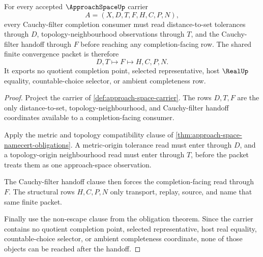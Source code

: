 \begin{theorem}
\label{thm:approach-space-completion-handoff}
For every accepted $\ApproachSpaceUp$ carrier
$$
A=(X,D,T,F,H,C,P,N),
$$
every Cauchy-filter completion consumer must read distance-to-set tolerances through $D$, topology-neighbourhood observations through $T$, and the Cauchy-filter handoff through $F$ before reaching any completion-facing row. The shared finite convergence packet is therefore
$$
D,T \longmapsto F \longmapsto H,C,P,N .
$$
It exports no quotient completion point, selected representative, host $\RealUp$ equality, countable-choice selector, or ambient completeness row.
\end{theorem}
\begin{proof}
Project the carrier of \autoref{def:approach-space-carrier}. The rows $D,T,F$ are the only distance-to-set, topology-neighbourhood, and Cauchy-filter handoff coordinates available to a completion-facing consumer.

Apply the metric and topology compatibility clause of \autoref{thm:approach-space-namecert-obligations}. A metric-origin tolerance read must enter through $D$, and a topology-origin neighbourhood read must enter through $T$, before the packet treats them as one approach-space observation.

The Cauchy-filter handoff clause then forces the completion-facing read through $F$. The structural rows $H,C,P,N$ only transport, replay, source, and name that same finite packet.

Finally use the non-escape clause from the obligation theorem. Since the carrier contains no quotient completion point, selected representative, host real equality, countable-choice selector, or ambient completeness coordinate, none of those objects can be reached after the handoff.
\end{proof}


\begin{closurestatus}{\ApproachSpaceUp}
  \theoryclosure{\seedClosure}
  \formalstatus{\unformalizedV}
\end{closurestatus}
